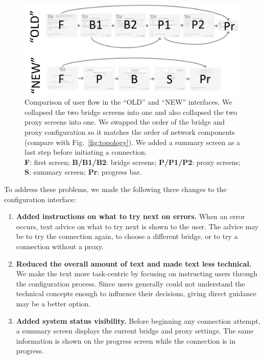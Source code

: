 \documentclass[USenglish,oneside,twocolumn]{article}
\begin{document}
 \label{redesign}
\begin{figure}[t]
\centering
\includegraphics[width=.85\textwidth]{old-and-new-flows.png}
\caption{
Comparison of user flow in the ``OLD'' and ``NEW'' interfaces.
We collapsed the two bridge screens into one 
and also collapsed the two proxy screens into one.
We swapped the order of the bridge and proxy configuration
so it matches the order of network components (compare with Fig.~\ref{fig:topology}).
We added a summary screen as a last step before initiating a connection.\\
\textbf{F}: first screen;
\textbf{B/B1/B2}: bridge screens;
\textbf{P/P1/P2}: proxy screens;
\textbf{S}: summary screen;
\textbf{Pr}: progress bar.
}
\label{fig:flow}
\end{figure} 

To address these problems, we made the following three changes to the configuration interface:  \\

\begin{enumerate}
\item {\bfseries Added instructions on what to try next on errors.} When an error occurs, text advice on what to try next is shown to the user. The advice may be to try the connection again, to choose a different bridge, or to try a connection without a proxy. 
\item {\bfseries Reduced the overall amount of text and made text less technical.} We make the text more task-centric by focusing on instructing users through the configuration process. Since users generally could not understand the technical concepts enough to influence their decisions, giving direct guidance may be a better option. 
\item {\bfseries Added system status visibility.} Before beginning any connection attempt, a summary screen displays the current bridge and proxy settings. The same information is shown on the progress screen while the connection is in progress.
\end{enumerate} 
\end{document}
